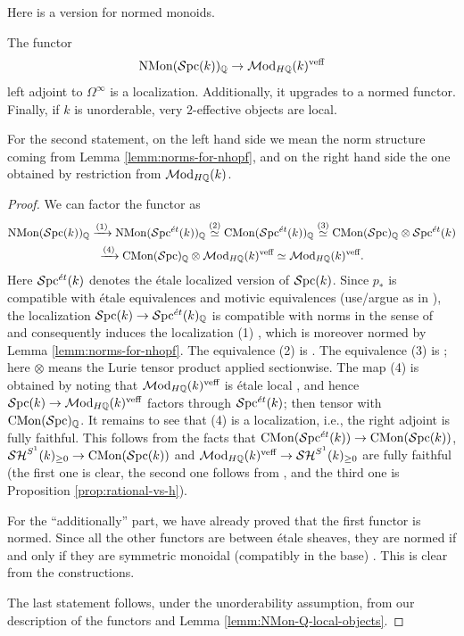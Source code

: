 \documentclass{amsart}
\numberwithin{proposition}{section}
\numberwithin{equation}{section}
\def\NMon{\mathrm{NMon}}
\begin{document}
Here is a version for normed monoids.
\begin{corollary} \label{cor:NMon-rat-loc}
The functor \[ \NMon(\Spc(k))_\Q \to \Mod_{H\Q}(k)^\veff \] left adjoint to $\Omega^\infty$ is a localization.
Additionally, it upgrades to a normed functor.
Finally, if $k$ is unorderable, very $2$-effective objects are local.
\end{corollary}
For the second statement, on the left hand side we mean the norm structure coming from Lemma \ref{lemm:norms-for-nhopf}, and on the right hand side the one obtained by restriction from $\mathcal{M}\mathrm{od}_{H\mathbb{Q}}(k)$.
\begin{proof}
We can factor the functor as \begin{gather*} \NMon(\Spc(k))_\Q \xrightarrow{(1)} \NMon(\Spc^\et(k))_\Q \stackrel{(2)}{\wequi} \CMon(\Spc^\et(k))_\Q \stackrel{(3)}{\wequi} \CMon(\Spc)_\Q \otimes \Spc^\et(k) \\ \xrightarrow{(4)} \CMon(\Spc)_\Q \otimes \Mod_{H\Q}(k)^\veff \wequi \Mod_{H\Q}(k)^\veff. \end{gather*}
Here $\mathcal{S}\mathrm{pc}{}^{\acute{e}t}(k)$ denotes the étale localized version of $\mathcal{S}\mathrm{pc}{}(k)$.
Since $p_*$ is compatible with étale equivalences and motivic equivalences (use/argue as in \cite[Proposition 2.11]{bachmann-norms}), the localization $\mathcal{S}\mathrm{pc}{}(k) \to \mathcal{S}\mathrm{pc}{}^{\acute{e}t}(k)_{\mathbb{Q}}$ is compatible with norms in the sense of \cite[Definition 6.14]{bachmann-norms} and consequently induces the localization (1) \cite[Proposition 6.16 and Lemmas D.3, D.6]{bachmann-norms}, which is moreover normed by Lemma \ref{lemm:norms-for-nhopf}.
The equivalence (2) is \cite[Corollary C.16]{bachmann-norms}.
The equivalence (3) is \cite[Theorem~4.6]{gepner2016universality}; here $\otimes$ means the Lurie tensor product applied sectionwise.
The map (4) is obtained by noting that $\mathcal{M}\mathrm{od}_{H\mathbb{Q}}(k)^{\text{veff}}$ is étale local \cite[Theorem~14.3.4(1)]{triangulated-mixed-motives}, and hence $\mathcal{S}\mathrm{pc}{}(k) \to \mathcal{M}\mathrm{od}_{H\mathbb{Q}}(k)^{\text{veff}}$ factors through $\mathcal{S}\mathrm{pc}{}^{\acute{e}t}(k)$; then tensor with $\mathrm{CMon}(\mathcal{S}\mathrm{pc}{})_{\mathbb{Q}}$.
It remains to see that (4) is a localization, i.e., the right adjoint is fully faithful.
This follows from the facts that $\mathrm{CMon}(\mathcal{S}\mathrm{pc}{}^{\acute{e}t}(k)) \to \mathrm{CMon}(\mathcal{S}\mathrm{pc}{}(k))$, $\mathcal{SH}^{S^1}(k)_{\ge 0} \to \mathrm{CMon}(\mathcal{S}\mathrm{pc}{}(k))$ and $\mathcal{M}\mathrm{od}_{H\mathbb{Q}}(k)^{\text{veff}} \to \mathcal{SH}^{S^1}(k)_{\ge 0}$ are fully faithful (the first one is clear, the second one follows from \cite[Proposition~3.1.9]{EHKSY}, and the third one is Proposition \ref{prop:rational-vs-h}).

For the ``additionally'' part, we have already proved that the first functor is normed.
Since all the other functors are between étale sheaves, they are normed if and only if they are symmetric monoidal (compatibly in the base) \cite[Corollary C.13]{bachmann-norms}.
This is clear from the constructions.

The last statement follows, under the unorderability assumption, from our description of the functors and Lemma \ref{lemm:NMon-Q-local-objects}.
\end{proof}
\end{document}
